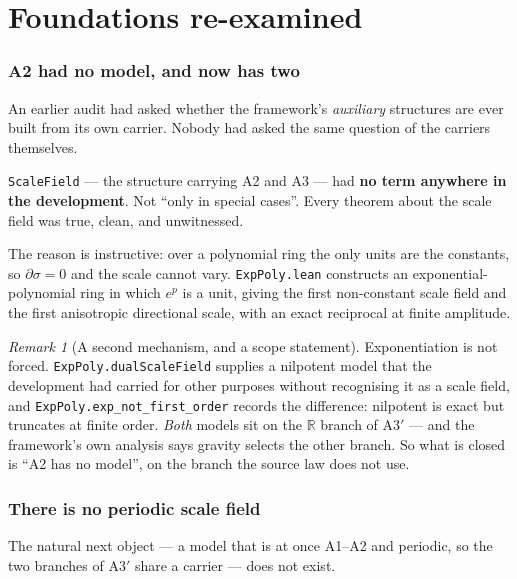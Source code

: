 \documentclass[11pt,a4paper]{article}
\theoremstyle{definition}
\theoremstyle{remark}
\newtheorem{remark}[theorem]{Remark}
\newcommand{\lean}[1]{\texttt{\small #1}}
\newcommand{\sg}{\sigma}
\newcommand{\Athree}{\ensuremath{\mathrm{A3}'}}
\begin{document}
\part{Foundations re-examined}

\section{A2 had no model, and now has two}
\label{sec:model}

An earlier audit had asked whether the framework's \emph{auxiliary} structures are
ever built from its own carrier. Nobody had asked the same question of the
carriers themselves.

\begin{claimbox}
\lean{ScaleField} --- the structure carrying A2 and A3 --- had \textbf{no term
anywhere in the development}. Not ``only in special cases''. Every theorem about
the scale field was true, clean, and unwitnessed.
\end{claimbox}

The reason is instructive: over a polynomial ring the only units are the constants,
so $\partial\sg=0$ and the scale cannot vary. \lean{ExpPoly.lean} constructs an
exponential-polynomial ring in which $e^{p}$ is a unit, giving the first
non-constant scale field and the first anisotropic directional scale, with an
exact reciprocal at finite amplitude.

\begin{remark}[A second mechanism, and a scope statement]
Exponentiation is not forced. \lean{ExpPoly.dualScaleField} supplies a nilpotent
model that the development had carried for other purposes without recognising it
as a scale field, and \lean{ExpPoly.exp\_not\_first\_order} records the difference:
nilpotent is exact but truncates at finite order. \emph{Both} models sit on the
$\mathbb{R}$ branch of \Athree{} --- and the framework's own analysis says gravity
selects the other branch. So what is closed is ``A2 has no model'', on the branch
the source law does not use.
\end{remark}

\section{There is no periodic scale field}
\label{sec:circle}

The natural next object --- a model that is at once A1--A2 and periodic, so the two
branches of \Athree{} share a carrier --- does not exist.
\end{document}
